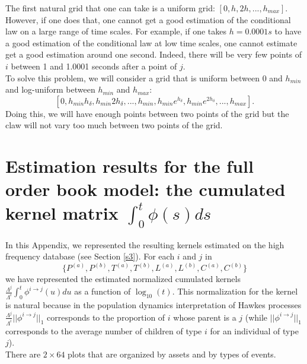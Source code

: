 \documentclass[a4paper,11pt]{article}
\newcommand{\PA}{P^{(a)}}
\newcommand{\PB}{P^{(b)}}
\newcommand{\TA}{T^{(a)}}
\newcommand{\TB}{T^{(b)}}
\newcommand{\CA}{C^{(a)}}
\newcommand{\CB}{C^{(b)}}
\newcommand{\LA}{L^{(a)}}
\newcommand{\LB}{L^{(b)}}
\begin{document}
The first natural grid that one can take is a uniform grid: $[0,h,2h,...,h_{max}]$. However, if one does that, one cannot get a good estimation of the conditional law on a large range of time scales. For example, if one takes $h=0.0001s$ to have a good estimation of the conditional law at low time scales, one cannot estimate get a good estimation around one second. Indeed, there will be very few points of $i$ between 1 and 1.0001 seconds after a point of $j$.\\

\noindent To solve this problem, we will consider a grid that is uniform between 0 and $h_{min}$ and log-uniform between $h_{min}$ and $h_{max}$:
\begin{equation}
\label{hhh}
[0,h_{min}h_\delta,h_{min}2h_\delta,... ,h_{min},h_{min} e^{h_\delta},h_{min} e^{2h_\delta},...,h_{max}].
\end{equation}
Doing this, we will have enough points between two points of the grid but the claw will not vary too much between two points of the grid.




\section{Estimation results for the full order book model: the cumulated kernel matrix $\int_0^t \phi(s) ds$}
\label{plot}
In this Appendix, we represented the resulting kernels estimated on the high frequency database (see Section \ref{s3}).
For each $i$ and $j$ in $$\{ \PA, \PB, \TA, \TB, \LA, \LB, \CA, \CB \}$$ we have represented
the estimated normalized cumulated kernels
$\frac{\Lambda^j}{\Lambda^i}\int_0^t \phi^{i \rightarrow j}(u) du$ as a function of $\log_{10}(t)$.
This normalization for the kernel is natural because in the population dynamics interpretation of Hawkes processes $\frac{\Lambda^j}{\Lambda^i}||\phi^{i\rightarrow j}||_1$ corresponds to the proportion of $i$ whose parent is a $j$ (while $||\phi^{i\rightarrow j}||_1$ corresponds to the average number of children of type $i$ for an individual of type $j$).\\

\noindent There are $2\times 64$ plots that are organized by assets and by types of events.


\captionsetup[subfigure]{labelformat=empty}
\end{document}
